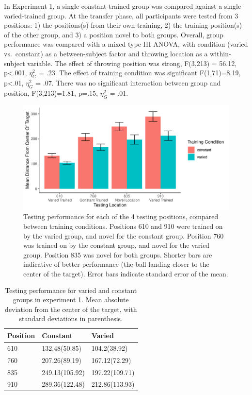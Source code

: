 \documentclass[
  jou, donotrepeattitle,floatsintext]{apa7}
\begin{document}
In Experiment 1, a single constant-trained group was compared against a single varied-trained group. At the transfer phase, all participants were tested from 3 positions: 1) the positions(s) from their own training, 2) the training position(s) of the other group, and 3) a position novel to both groups. Overall, group performance was compared with a mixed type III ANOVA, with condition (varied vs.~constant) as a between-subject factor and throwing location as a within-subject variable. The effect of throwing position was strong, F(3,213) = 56.12, p\textless.001, \(\eta^{2}_G\) = .23. The effect of training condition was significant F(1,71)=8.19, p\textless.01, \(\eta^{2}_G\) = .07. There was no significant interaction between group and position, F(3,213)=1.81, p=.15, \(\eta^{2}_G\) = .01.



\begin{figure}
\centering
\includegraphics{IGAS_PJ_files/figure-latex/e1Test-1.pdf}
\caption{\label{fig:e1Test}Testing performance for each of the 4 testing positions, compared between training conditions. Positions 610 and 910 were trained on by the varied group, and novel for the constant group. Position 760 was trained on by the constant group, and novel for the varied group. Position 835 was novel for both groups. Shorter bars are indicative of better performance (the ball landing closer to the center of the target). Error bars indicate standard error of the mean.}
\end{figure}



\begin{table}

\caption{\label{tab:e1Table}Testing performance for varied and constant groups in experiment 1. Mean absolute deviation from the center of the target, with standard deviations in parenthesis.}
\begin{tabular}[t]{lll}
\toprule
Position & Constant & Varied\\
\midrule
610 & 132.48(50.85) & 104.2(38.92)\\
760 & 207.26(89.19) & 167.12(72.29)\\
835 & 249.13(105.92) & 197.22(109.71)\\
910 & 289.36(122.48) & 212.86(113.93)\\
\bottomrule
\end{tabular}
\end{table}
\end{document}

